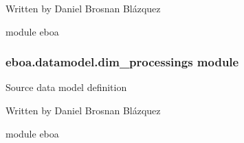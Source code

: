 Written by Daniel Brosnan Blázquez

module eboa


\subsubsection{eboa.datamodel.dim\_processings module}
\label{\detokenize{eboa.datamodel:module-eboa.datamodel.sources}}\label{\detokenize{eboa.datamodel:eboa-datamodel-dim-processings-module}}
Source data model definition

Written by Daniel Brosnan Blázquez

module eboa

